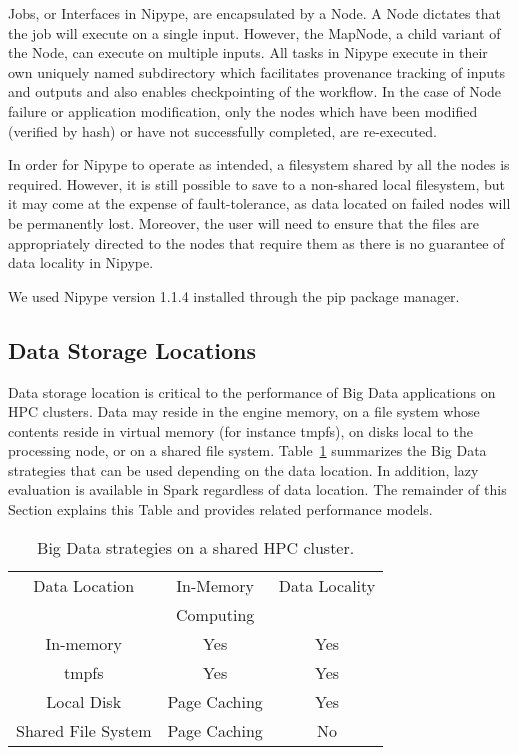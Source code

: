 \documentclass{IEEEtran}
\begin{document}
Jobs, or Interfaces in Nipype, are encapsulated by a Node. A Node dictates that
the job will execute on a single input. However, the MapNode, 
a child variant of the Node, can execute on multiple inputs. All tasks in
Nipype execute in their own uniquely named subdirectory which facilitates provenance 
tracking of inputs and outputs and also enables checkpointing of the workflow.
In the case of Node failure or application modification, only the nodes which have
been modified (verified by hash) or have not successfully completed, are re-executed.

In order for Nipype to operate as intended, a filesystem shared by all the nodes 
is required. However, it is still possible to save to a non-shared 
local filesystem, but it may come at the expense of fault-tolerance, as data 
located on failed nodes will be permanently lost. Moreover, the 
user will need to ensure that the files are appropriately directed to 
the nodes that require them as there is no guarantee of data locality 
in Nipype.

We used Nipype version 1.1.4 installed through the pip package manager.

\subsection{Data Storage Locations}

Data storage location is critical to the performance of Big Data 
applications on HPC clusters.
Data may reside in the engine memory, on 
a file system whose contents reside in virtual memory (for instance 
tmpfs), on disks local to the processing node, or on a shared 
file system. Table~\ref{table:features} summarizes the Big Data 
strategies that can be used depending on the data location. In 
addition, lazy evaluation is available in Spark regardless of data 
location. The remainder of this Section explains this Table and 
provides related performance models.
\begin{table}
\centering
\begin{tabular}{c|cc}
   \rowcolor{headcolor}
    Data Location                 & In-Memory     & Data Locality        \\
    \rowcolor{headcolor}
                                  & Computing     &                     \\
                                  \hline          
In-memory                         & \cellcolor{green!25} Yes           & \cellcolor{green!25}Yes                      \\
tmpfs                             & \cellcolor{green!25} Yes           & \cellcolor{green!25}Yes                  \\
Local Disk                        & \cellcolor{orange!25}Page Caching  & \cellcolor{green!25}Yes                  \\
Shared File System                & \cellcolor{orange!25}Page Caching  & \cellcolor{red!25}No                
\end{tabular}
\setlength{\belowcaptionskip}{-10pt}
\caption{Big Data strategies on a shared HPC cluster.}
\label{table:features}
\end{table}
\end{document}
